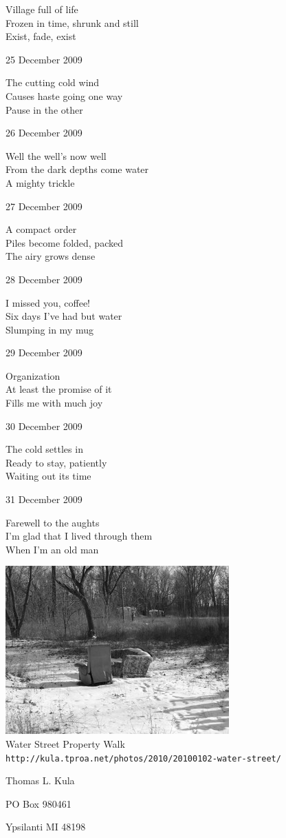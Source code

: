 \documentclass[12pt]{article}
\begin{document}
Village full of life \\
Frozen in time, shrunk and still \\
Exist, fade, exist


\newpage

25 December 2009

The cutting cold wind \\
Causes haste going one way \\
Pause in the other

26 December 2009

Well the well's now well \\
From the dark depths come water \\
A mighty trickle

27 December 2009

A compact order \\
Piles become folded, packed \\
The airy grows dense

28 December 2009

I missed you, coffee! \\
Six days I've had but water \\
Slumping in my mug

29 December 2009

Organization \\
At least the promise of it \\
Fills me with much joy

30 December 2009

The cold settles in \\
Ready to stay, patiently \\
Waiting out its time

31 December 2009

Farewell to the aughts \\
I'm glad that I lived through them \\
When I'm an old man




\newpage

\begin{center}
\includegraphics{water-street.jpg} \\[1cm]
Water Street Property Walk \\
{\tt http://kula.tproa.net/photos/2010/20100102-water-street/ }
\end{center}

\newpage

\thispagestyle{empty}
\vspace*{14cm}
\begin{sideways}
\Large{Thomas L. Kula}
\end{sideways}
\begin{sideways}
\Large{PO Box 980461}
\end{sideways}
\begin{sideways}
\Large{Ypsilanti MI 48198}
\end{sideways}
\end{document}
